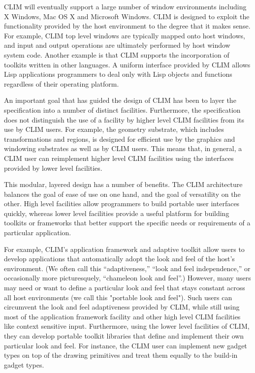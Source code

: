 \documentclass[twocolumn,a4paper]{article}
\newcommand {\CLIM}{{\small CLIM}}
\begin{document}
\CLIM{} will eventually support a large number of window environments including X Windows, Mac OS X and Microsoft Windows. \CLIM{} is designed to exploit the functionality provided by the host environment to the degree that it makes sense. For example, \CLIM{} top level windows are typically mapped onto host windows, and input and output operations are ultimately performed by host window system code. Another example is that \CLIM{} supports the incorporation of toolkits written in other languages. A uniform interface provided by \CLIM{} allows Lisp applications programmers to deal only with Lisp objects and functions regardless of their operating platform.

An important goal that has guided the design of \CLIM{} has been to layer the specification into a number of distinct facilities. Furthermore, the specification does not distinguish the use of a facility by higher level \CLIM{} facilities from its use by \CLIM{} users. For example, the geometry substrate, which includes transformations and regions, is designed for efficient use by the graphics and windowing substrates as well as by \CLIM{} users. This means that, in general, a \CLIM{} user can reimplement higher level \CLIM{} facilities using the interfaces provided by lower level facilities. 

This modular, layered design has a number of benefits. The \CLIM{} architecture balances the goal of ease of use on one hand, and the goal of versatility on the other. High level facilities allow programmers to build portable user interfaces quickly, whereas lower level facilities provide a useful platform for building toolkits or frameworks that better support the specific needs or requirements of a particular application. 

For example, \CLIM{}'s application framework and adaptive toolkit allow users to develop applications that automatically adopt the look and feel of the host's environment. (We often call this ``adaptiveness,'' ``look and feel independence,'' or occasionally more picturesquely, ``chameleon look and feel''.) However, many users may need or want to define a particular look and feel that stays constant across all host environments (we call this "portable look and feel"). Such users can circumvent the look and feel adaptiveness provided by \CLIM{}, while still using most of the application framework facility and other high level \CLIM{} facilities like context sensitive input. Furthermore, using the lower level facilities of \CLIM{}, they can develop portable toolkit libraries that define and implement their own particular look and feel. For instance, the \CLIM{} user can implement new gadget types on top of the drawing primitives and treat them equally to the build-in gadget types.
\end{document}
